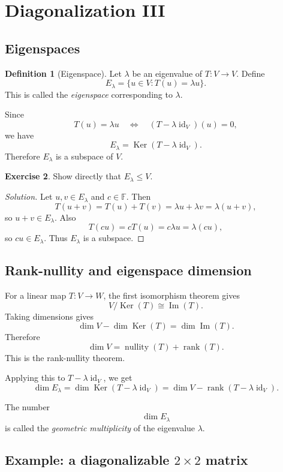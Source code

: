 \documentclass[11pt]{article}
\newcommand{\F}{\mathbb F}
\newcommand{\id}{\operatorname{id}}
\newcommand{\rank}{\operatorname{rank}}
\newcommand{\Ker}{\operatorname{Ker}}
\newcommand{\Imop}{\operatorname{Im}}
\newcommand{\nullity}{\operatorname{nullity}}
\theoremstyle{definition}
\newtheorem{definition}{Definition}[section]
\newtheorem{exercise}[definition]{Exercise}
\theoremstyle{plain}
\begin{document}
\section{Diagonalization III}

\subsection{Eigenspaces}

\begin{definition}[Eigenspace]
Let $\lambda$ be an eigenvalue of $T:V\to V$.  Define
\[
E_{\lambda}=\{u\in V:T(u)=\lambda u\}.
\]
This is called the \emph{eigenspace} corresponding to $\lambda$.
\end{definition}

Since
\[
T(u)=\lambda u
\quad\Longleftrightarrow\quad
(T-\lambda\id_V)(u)=0,
\]
we have
\[
E_{\lambda}=\Ker(T-\lambda\id_V).
\]
Therefore $E_{\lambda}$ is a subspace of $V$.

\begin{exercise}
Show directly that $E_{\lambda}\leq V$.
\end{exercise}

\begin{proof}[Solution]
Let $u,v\in E_{\lambda}$ and $c\in\F$.  Then
\[
T(u+v)=T(u)+T(v)=\lambda u+\lambda v=\lambda(u+v),
\]
so $u+v\in E_{\lambda}$.  Also
\[
T(cu)=cT(u)=c\lambda u=\lambda(cu),
\]
so $cu\in E_{\lambda}$.  Thus $E_{\lambda}$ is a subspace.
\end{proof}

\subsection{Rank-nullity and eigenspace dimension}

For a linear map $T:V\to W$, the first isomorphism theorem gives
\[
V/\Ker(T)\cong \Imop(T).
\]
Taking dimensions gives
\[
\dim V-\dim\Ker(T)=\dim\Imop(T).
\]
Therefore
\[
\dim V=\nullity(T)+\rank(T).
\]
This is the rank-nullity theorem.

Applying this to $T-\lambda\id_V$, we get
\[
\dim E_{\lambda}
=\dim\Ker(T-\lambda\id_V)
=\dim V-\rank(T-\lambda\id_V).
\]

The number
\[
\dim E_{\lambda}
\]
is called the \emph{geometric multiplicity} of the eigenvalue $\lambda$.

\subsection{Example: a diagonalizable \texorpdfstring{$2\times2$}{2x2} matrix}
\end{document}
